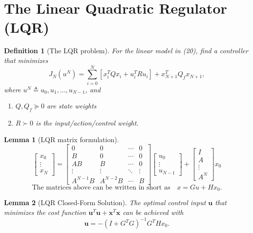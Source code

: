 \documentclass[a4 paper]{article}
\numberwithin{equation}{section}
\theoremstyle{boldStyle}
\theoremstyle{boldBlueStyle}
\newtheorem{lemma}{Lemma}[section]
\theoremstyle{boldPurpleStyle}
\theoremstyle{boldRedStyle}
\newtheorem{definition}{Definition}[section]
\theoremstyle{boldGreenStyle}
\begin{document}
\section{The Linear Quadratic Regulator (LQR)}

\begin{definition}[The LQR problem]
  For the linear model in (20), find a controller that minimizes
  \[
  J_N(u^N) = \sum_{i=0}^{N} [x_i^T Q x_i + u_i^T R u_i] + x_{N+1}^T Q_f x_{N+1},
  \]
  where \( u^N \triangleq u_0, u_1, \ldots, u_{N-1} \), and
  \begin{enumerate}
      \item \( Q, Q_f \succeq 0 \) are state weights
      \item \( R \succ 0 \) is the input/action/control weight. 
  \end{enumerate}
\end{definition}


\begin{lemma}[LQR matrix formulation]
  \[
\begin{bmatrix}
x_0 \\
\vdots \\
x_N
\end{bmatrix}
=
\begin{bmatrix}
0 & 0 & \cdots & 0 \\
B & 0 & \cdots & 0 \\
AB & B & \cdots & 0 \\
\vdots & \vdots & \ddots & \vdots \\
A^{N-1}B & A^{N-2}B & \cdots & B
\end{bmatrix}
\begin{bmatrix}
u_0 \\
\vdots \\
u_{N-1}
\end{bmatrix}
+
\begin{bmatrix}
I \\
A \\
\vdots \\
A^N
\end{bmatrix}
x_0
\]
\[
\text{The matrices above can be written in short as} \quad x = Gu + Hx_0.
\]
\end{lemma}

\begin{lemma}[LQR Closed-Form Solution]
  The optimal control input \( \mathbf{u} \) that minimizes the cost function \( \mathbf{u}^T \mathbf{u} + \mathbf{x}^T \mathbf{x} \) can be achieved with
  \[
  \mathbf{u} = -(I + G^T G)^{-1} G^T H x_0.
  \]
\end{lemma}
\end{document}
